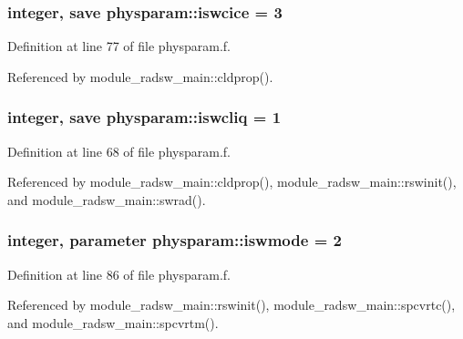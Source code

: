 \subsubsection[{\texorpdfstring{iswcice}{iswcice}}]{\setlength{\rightskip}{0pt plus 5cm}integer, save physparam\+::iswcice = 3}\hypertarget{namespacephysparam_a7b5967eca1b21aa0d5ccd9531a6f8abb}{}\label{namespacephysparam_a7b5967eca1b21aa0d5ccd9531a6f8abb}


Definition at line 77 of file physparam.\+f.



Referenced by module\+\_\+radsw\+\_\+main\+::cldprop().

\subsubsection[{\texorpdfstring{iswcliq}{iswcliq}}]{\setlength{\rightskip}{0pt plus 5cm}integer, save physparam\+::iswcliq = 1}\hypertarget{namespacephysparam_a7ad8c8c5860089a86ef637429c7d4d27}{}\label{namespacephysparam_a7ad8c8c5860089a86ef637429c7d4d27}


Definition at line 68 of file physparam.\+f.



Referenced by module\+\_\+radsw\+\_\+main\+::cldprop(), module\+\_\+radsw\+\_\+main\+::rswinit(), and module\+\_\+radsw\+\_\+main\+::swrad().

\subsubsection[{\texorpdfstring{iswmode}{iswmode}}]{\setlength{\rightskip}{0pt plus 5cm}integer, parameter physparam\+::iswmode = 2}\hypertarget{namespacephysparam_afe7d9a3a1e3cd4711675252a0921853b}{}\label{namespacephysparam_afe7d9a3a1e3cd4711675252a0921853b}


Definition at line 86 of file physparam.\+f.



Referenced by module\+\_\+radsw\+\_\+main\+::rswinit(), module\+\_\+radsw\+\_\+main\+::spcvrtc(), and module\+\_\+radsw\+\_\+main\+::spcvrtm().

